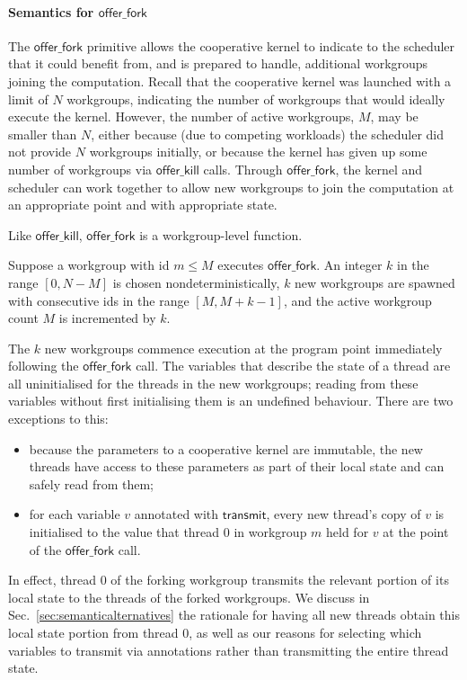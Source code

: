 \documentclass[numbers,nocopyrightspace,10pt]{sigplanconf}
\newcommand{\mysec}{Sec.~}
\newcommand{\transmit}{\mathsf{transmit}}
\newcommand{\offerfork}{\mathsf{offer\_fork}}
\newcommand{\offerkill}{\mathsf{offer\_kill}}
\begin{document}
\paragraph{Semantics for $\offerfork$}

The $\offerfork$ primitive allows the cooperative kernel to indicate
to the scheduler that it could benefit from, and is prepared to
handle, additional workgroups joining the computation.  Recall that
the cooperative kernel was launched with a limit of $N$ workgroups,
indicating the number of workgroups that would ideally execute the
kernel.  However, the number of active workgroups, $M$, may be smaller
than $N$, either because (due to competing workloads) the scheduler
did not provide $N$ workgroups initially, or because the kernel has
given up some number of workgroups via $\offerkill$ calls.  Through
$\offerfork$, the kernel and scheduler can work together to allow new
workgroups to join the computation at an appropriate point and with
appropriate state.

Like $\offerkill$, $\offerfork$ is a workgroup-level function.

Suppose a workgroup with id $m\leq M$ executes $\offerfork$.  An
integer $k$ in the range $[0, N-M]$ is chosen nondeterministically,
$k$ new workgroups are spawned with consecutive ids in the range $[M,
  M+k-1]$, and the active workgroup count $M$ is incremented by $k$.

The $k$ new workgroups commence execution at the program point
immediately following the $\offerfork$ call.  The variables that
describe the state of a thread are all uninitialised for the threads
in the new workgroups; reading from these variables without first
initialising them is an undefined behaviour.  There are two exceptions
to this:

\begin{itemize}

\item because the parameters to a cooperative kernel are immutable,
  the new threads have access to these parameters as part of their
  local state and can safely read from them;

\item for each variable $v$ annotated with $\transmit$, every new
  thread's copy of $v$ is initialised to the value that thread 0 in
  workgroup $m$ held for $v$ at the point of the $\offerfork$ call.

\end{itemize}

In effect, thread 0 of the forking workgroup transmits the relevant
portion of its local state to the threads of the forked workgroups.
We discuss in \mysec\ref{sec:semanticalternatives} the rationale for
having all new threads obtain this local state portion from thread 0,
as well as our reasons for selecting which variables to transmit via
annotations rather than transmitting the entire thread state.
\end{document}

